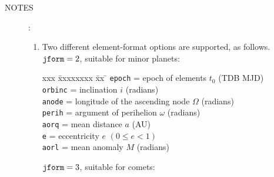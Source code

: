 \documentclass[11pt,fleqn,twoside]{article}
\renewcommand{\_}{{\tt\char'137}}     %
\newlength{\oldspacing}
\newcommand{\notes}[1]
{
  \goodbreak
  \setlength{\oldspacing}{\topsep}
  \setlength{\topsep}{0.3ex}
  \begin{description}
    \item[NOTES]:
        #1
  \end{description}
  \setlength{\topsep}{\oldspacing}
}
\begin{document}
\notes
{
 \begin{enumerate}
  \item Two different element-format options are supported, as follows. \\
 
        ${\tt jform}=2$, suitable for minor planets:
 
        \begin{tabbing}
        xxx \= xxxxxxxx \= xx \= \kill
        \> {\tt epoch}  \> = \> epoch of elements $t_0$ (TDB MJD) \\
        \> {\tt orbinc} \> = \> inclination $i$ (radians) \\
        \> {\tt anode}  \> = \> longitude of the ascending node $\Omega$ (radians) \\
        \> {\tt perih}  \> = \> argument of perihelion $\omega$ (radians) \\
        \> {\tt aorq}   \> = \> mean distance $a$ (AU) \\
        \> {\tt e}      \> = \> eccentricity $e$ $( 0 \leq e < 1 )$ \\
        \> {\tt aorl}   \> = \> mean anomaly $M$ (radians)
        \end{tabbing}
 
        ${\tt jform}=3$, suitable for comets:
 

\end{enumerate}}
\end{document}
